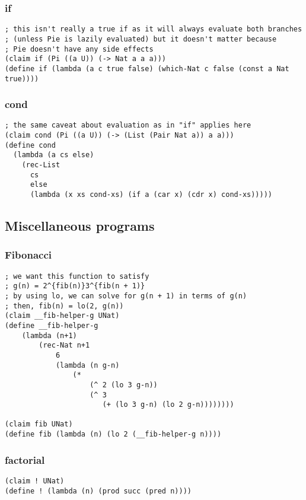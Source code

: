 \subsubsection{if} \label{code:if}
\begin{verbatim}
; this isn't really a true if as it will always evaluate both branches
; (unless Pie is lazily evaluated) but it doesn't matter because
; Pie doesn't have any side effects 
(claim if (Pi ((a U)) (-> Nat a a a)))
(define if (lambda (a c true false) (which-Nat c false (const a Nat true))))
\end{verbatim}

\subsubsection{cond} \label{code:cond}
\begin{verbatim}
; the same caveat about evaluation as in "if" applies here
(claim cond (Pi ((a U)) (-> (List (Pair Nat a)) a a)))
(define cond
  (lambda (a cs else)
    (rec-List
      cs
      else
      (lambda (x xs cond-xs) (if a (car x) (cdr x) cond-xs)))))
\end{verbatim}


\subsection{Miscellaneous programs}

\subsubsection{Fibonacci} \label{code:Fibonacci}
\begin{verbatim}
; we want this function to satisfy
; g(n) = 2^{fib(n)}3^{fib(n + 1)}
; by using lo, we can solve for g(n + 1) in terms of g(n)
; then, fib(n) = lo(2, g(n))
(claim __fib-helper-g UNat)
(define __fib-helper-g
    (lambda (n+1)
        (rec-Nat n+1
            6
            (lambda (n g-n) 
                (*
                    (^ 2 (lo 3 g-n))
                    (^ 3
                       (+ (lo 3 g-n) (lo 2 g-n))))))))

(claim fib UNat)
(define fib (lambda (n) (lo 2 (__fib-helper-g n))))
\end{verbatim}

\subsubsection{factorial} \label{code:factorial}
\begin{verbatim}
(claim ! UNat)
(define ! (lambda (n) (prod succ (pred n))))
\end{verbatim}

